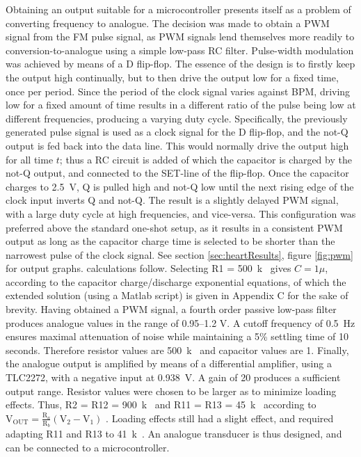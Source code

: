 Obtaining an output suitable for a microcontroller presents itself as a problem of converting frequency to analogue. The decision was made to obtain a PWM signal from the FM pulse signal, as PWM signals lend themselves more readily to conversion-to-analogue using a simple low-pass RC filter. Pulse-width modulation was achieved by means of a D flip-flop. The essence of the design is to firstly keep the output high continually, but to then drive the output low for a fixed time, once per period. Since the period of the clock signal varies against BPM, driving low for a fixed amount of time results in a different ratio of the pulse being low at different frequencies, producing a varying duty cycle. Specifically, the previously generated pulse signal is used as a clock signal for the D flip-flop, and the not-Q output is fed back into the data line. This would normally drive the output high for all time $t$; thus a RC circuit is added of which the capacitor is charged by the not-Q output, and connected to the SET-line of the flip-flop. Once the capacitor charges to \SI{2.5}{V}, Q is pulled high and not-Q low until the next rising edge of the clock input inverts Q and not-Q. The result is a slightly delayed PWM signal, with a large duty cycle at high frequencies, and vice-versa. This configuration was preferred above the standard one-shot setup, as it results in a consistent PWM output as long as the capacitor charge time is selected to be shorter than the narrowest pulse of the clock signal. See section \ref{sec:heartResults}, figure \ref{fig:pwm} for output graphs.  calculations follow. Selecting R1 = \SI{500}{k\Omega} gives $C = 1\mu$, according to the capacitor charge/discharge exponential equations, of which the extended solution (using a Matlab script) is given in Appendix C for the sake of brevity. Having obtained a PWM signal, a fourth order passive low-pass filter produces analogue values in the range of \numrange{0.95}{1.2} \si{V}. A cutoff frequency of \SI{0.5}{Hz} ensures maximal attenuation of noise while maintaining a 5\% settling time of 10 seconds. Therefore resistor values are \SI{500}{k\Omega} and capacitor values are \SI{1}{\mu}. Finally, the analogue output is amplified by means of a differential amplifier, using a TLC2272, with a negative input at \SI{0.938}{V}. A gain of 20 produces a sufficient output range. Resistor values were chosen to be larger as to minimize loading effects. Thus, R2 = R12 = \SI{900}{k\Omega} and R11 = R13 = \SI{45}{k\Omega} according to $\mathrm{V}_{\mathrm{OUT}}=\frac{\mathrm{R}_{a}}{\mathrm{R}_{b}}\left(\mathrm{V}_{2}-\mathrm{V}_{1}\right)$ \cite{opamp}. Loading effects still had a slight effect, and required adapting R11 and R13 to \SI{41}{k\Omega}. An analogue transducer is thus designed, and can be connected to a microcontroller.

